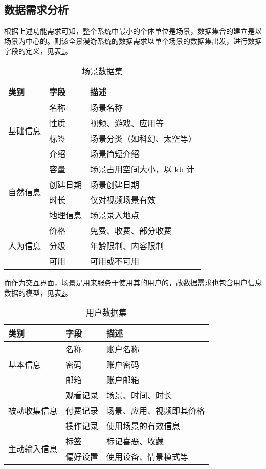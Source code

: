 \subsection{数据需求分析}
根据上述功能需求可知，整个系统中最小的个体单位是场景，数据集合的建立是以场景为中心的。则该全景漫游系统的数据需求以单个场景的数据集出发，进行数据字段的定义，见表\ref{tab:data}。

\begin{table}[htp]
\centering
\caption{场景数据集}
\vskip 5pt
\begin{tabular}{lll}
\toprule
类别 & 字段 & 描述 \\
\midrule
\multirow{4}{*}{基础信息}& 名称 & 场景名称 \\
& 性质 & 视频、游戏、应用等 \\
& 标签 & 场景分类（如科幻、太空等） \\
& 介绍 & 场景简短介绍 \\
\midrule
\multirow{4}{*}{自然信息}& 容量 & 场景占用空间大小，以 kb 计 \\
& 创建日期 & 场景创建日期 \\
& 时长 & 仅对视频场景有效 \\
& 地理信息 & 场景录入地点 \\
\midrule
\multirow{3}{*}{人为信息}& 价格 & 免费、收费、部分收费 \\
& 分级 & 年龄限制、内容限制 \\
& 可用 & 可用或不可用 \\
\bottomrule
\end{tabular}
\label{tab:data}
\end{table}

而作为交互界面，场景是用来服务于使用其的用户的，故数据需求也包含用户信息数据的模型，见表\ref{tab:user}。

\begin{table}[htp]
\centering
\caption{用户数据集}
\vskip 5pt
\begin{tabular}{lll}
\toprule
类别 & 字段 & 描述 \\
\midrule
\multirow{3}{*}{基本信息} & 名称 & 账户名称 \\
& 密码 & 账户密码 \\
& 邮箱 & 账户邮箱 \\
\midrule
\multirow{3}{*}{被动收集信息} & 观看记录 & 场景、时间、时长 \\
& 付费记录 & 场景、应用、视频即其价格 \\
& 操作记录 & 使用场景的有效信息 \\
\midrule
\multirow{3}{*}{主动输入信息} & 标签 & 标记喜恶、收藏 \\
& 偏好设置 & 使用设备、情景模式等 \\
\bottomrule
\end{tabular}
\label{tab:user}
\end{table}

